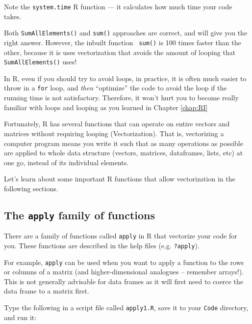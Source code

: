 Note the {\tt system.time} R function --- it calculates how much time 
your code takes.

Both {\tt SumAllElements()} and {\tt sum()} approaches are correct, and 
will give you the right answer. However, the inbuilt function {\tt 
sum()}  is 100 times faster than the other, because it is uses 
vectorization that avoids the amount of looping that {\tt 
SumAllElements()} uses!

\begin{tipbox}
	In R, even if you should try to avoid loops, in practice, it is often 
	much easier to throw in a {\tt for} loop, and {\it then} ``optimize'' 
	the code to avoid the loop if the running time is not 
	satisfactory. Therefore, it won't hurt you to become really familiar 
	with loops and looping as you learned in Chapter \ref{chap:RI}  
\end{tipbox} 

Fortunately, R has several functions that can operate on entire vectors 
and matrices without requiring looping (Vectorization). That is, 
vectorizing a computer program means you write it such that as many 
operations as possible are applied to whole data structure (vectors, 
matrices, dataframes, lists, etc) at one go, instead of its individual 
elements. 

Let's learn about some important R functions that allow vectorization 
in the following sections.

\subsection{The {\tt *apply} family of functions}

There are a family of functions called {\tt *apply} in R that vectorize 
your code for you. These functions are described in the help files (e.g. 
{\tt ?apply}). 

For example, {\tt apply} can be used when you want to apply a function 
to the rows or columns of a matrix (and higher-dimensional analogues -- 
remember arrays!). This is not generally advisable for data frames as 
it will first need to coerce the data frame to a matrix first.

\begin{compactitem}[$\quad\star$]
\item Type the following in a script file called {\tt apply1.R}, save 
it to your {\tt Code} directory, and run it:
\end{compactitem}



